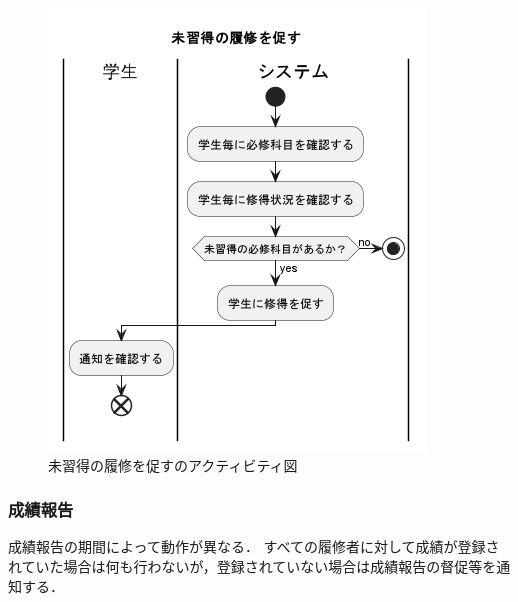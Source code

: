 \documentclass[documentclass]{jsarticle}
\begin{document}
\begin{figure}[H]
  \begin{minipage}[b]{0.49\columnwidth}
      \centering
      \includegraphics[width=0.8\columnwidth]{figure/7-6.png}
      \caption{未習得の履修を促すのアクティビティ図}
      \label{fig:7-6}
  \end{minipage}
\end{figure}

\subsubsection*{成績報告}
成績報告の期間によって動作が異なる．
すべての履修者に対して成績が登録されていた場合は何も行わないが，登録されていない場合は成績報告の督促等を通知する．
\end{document}
